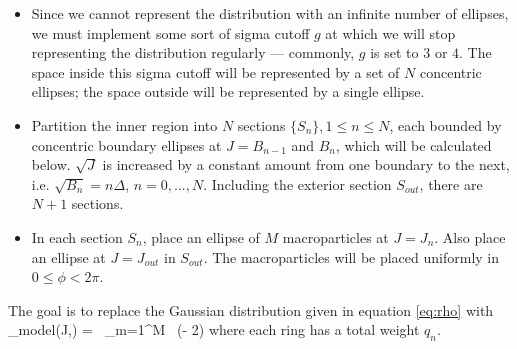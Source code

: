 \begin{itemize}
\item Since we cannot represent the distribution with an infinite number of ellipses, we must implement some sort of sigma cutoff $g$ at which we will stop representing the distribution regularly --- commonly, $g$ is set to $3$ or $4$.  The space inside this sigma cutoff will be represented by a set of $N$ concentric ellipses; the space outside will be represented by a single ellipse.
\item Partition the inner region into $N$ sections $\lbrace S_{n} \rbrace, 1 \leq n \leq N$, each bounded by concentric boundary ellipses at $J = B_{n-1}$ and $B_{n}$, which will be calculated below.  $\sqrt{J}$ is increased by a constant amount from one boundary to the next, i.e. $\sqrt{B_{n}} = n\Delta$, $n = 0,...,N$.  Including the exterior section $S_{out}$, there are $N+1$ sections.
\item In each section $S_{n}$, place an ellipse of $M$ macroparticles at $J = J_{n}$.  Also place an ellipse at $J = J_{out}$ in $S_{out}$.  The macroparticles will be placed uniformly in $0 \leq \phi < 2\pi$.
\end{itemize}

The goal is to replace the Gaussian distribution given in equation \ref{eq:rho} with 
\Begineq
	\rho_{model}(J,\phi) = \left[ \sum_{n=1}^{N} q_{n} \, \delta(J - J_{n}) + q_{out} \, \delta(J - J_{out}) \right] \, \sum_{m=1}^{M}  \, \delta(\phi - 2\pi {})
\Endeq
where each ring has a total weight $q_{n}$.  

